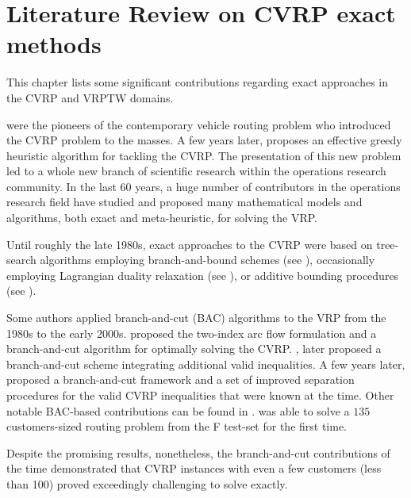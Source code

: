 \chapter{Literature Review on CVRP exact methods}
\label{sec:intro-literature-review}

This chapter lists some significant contributions regarding exact approaches
in the CVRP and VRPTW domains.

\Textcite{dantzig1959} were
the pioneers of the contemporary vehicle routing problem who
introduced the CVRP problem to the masses.
A few years later, \textcite{clarke1964} proposes
an effective greedy heuristic algorithm for tackling the CVRP.
The presentation of this new problem led to a whole new branch
of scientific research within the operations research community.
In the last 60 years, a huge number of contributors in
the operations research field have studied and proposed many
mathematical models and algorithms, both exact and meta-heuristic,
for solving the VRP.

Until roughly the late 1980s, exact approaches to the CVRP were
based on tree-search algorithms employing branch-and-bound schemes
(see \cite{pierce1969, christofides1969, christofides1981exact, laporte1986}),
occasionally employing Lagrangian duality relaxation (see \cite{fisher1994, miller1995}),
or additive bounding procedures (see \cite{fischetti1994a, hadjiconstantinou1995}).

Some authors applied branch-and-cut (BAC) algorithms  to the VRP from the 1980s to the early 2000s.
\textcite{laporte1983, laporte1985} proposed the two-index arc flow formulation
and a branch-and-cut algorithm for optimally solving the CVRP.
\Textcite{augerat1995approche}, later proposed a branch-and-cut scheme
integrating additional valid inequalities.
A few years later, \textcite{lysgaard2004}
proposed a branch-and-cut framework and
a set of improved separation procedures for the valid CVRP inequalities that were known at the time.
Other notable BAC-based contributions
can be found in \textcite{araqueg1994, augerat1995, achuthan1996, blasum2000, ralphs2003, achuthan2003, baldacci2004}.
\citeauthor{baldacci2004} was able to solve a $135$ customers-sized routing problem
from the F test-set \parencite{fisher1994}
for the first time.

Despite the promising results, nonetheless,
the branch-and-cut contributions of the time demonstrated
that CVRP instances with even a few customers (less than 100)
proved exceedingly challenging to solve exactly.

